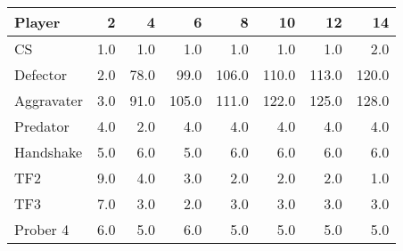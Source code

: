 \begin{tabular}{lrrrrrrr}
\toprule
     Player &    2 &     4 &      6 &      8 &     10 &     12 &     14 \\
\midrule
         CS &  1.0 &   1.0 &    1.0 &    1.0 &    1.0 &    1.0 &    2.0 \\
   Defector &  2.0 &  78.0 &   99.0 &  106.0 &  110.0 &  113.0 &  120.0 \\
 Aggravater &  3.0 &  91.0 &  105.0 &  111.0 &  122.0 &  125.0 &  128.0 \\
   Predator &  4.0 &   2.0 &    4.0 &    4.0 &    4.0 &    4.0 &    4.0 \\
  Handshake &  5.0 &   6.0 &    5.0 &    6.0 &    6.0 &    6.0 &    6.0 \\
        TF2 &  9.0 &   4.0 &    3.0 &    2.0 &    2.0 &    2.0 &    1.0 \\
        TF3 &  7.0 &   3.0 &    2.0 &    3.0 &    3.0 &    3.0 &    3.0 \\
   Prober 4 &  6.0 &   5.0 &    6.0 &    5.0 &    5.0 &    5.0 &    5.0 \\
\bottomrule
\end{tabular}
